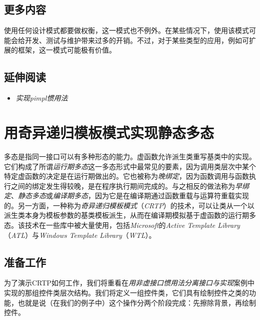 
\subsection{更多内容}



使用任何设计模式都要做权衡，这一模式也不例外。在某些情况下，使用该模式可能会给开发、测试与维护带来过多的开销。不过，对于某些类型的应用，例如可扩展的框架，这一模式可能极有价值。



\subsection{延伸阅读}



\begin{itemize}
\item \textit{实现pimpl惯用法}

\end{itemize}



\section{用奇异递归模板模式实现静态多态}



多态是指同一接口可以有多种形态的能力。虚函数允许派生类重写基类中的实现。它们构成了所谓\textit{运行期多态}这一多态形式中最常见的要素，因为调用类层次中某个特定虚函数的决定是在运行期做出的。它也被称为\textit{晚绑定}，因为函数调用与函数执行之间的绑定发生得较晚，是在程序执行期间完成的。与之相反的做法称为\textit{早绑定}、\textit{静态多态}或\textit{编译期多态}，因为它是在编译期通过函数重载与运算符重载实现的。另一方面，一种称为\textit{奇异递归模板模式}（\textit{CRTP}）的技术，可以让类从一个以派生类本身为模板参数的基类模板派生，从而在编译期模拟基于虚函数的运行期多态。该技术在一些库中被大量使用，包括\textit{Microsoft}的\textit{Active Template Library}（\textit{ATL}）与\textit{Windows Template} \textit{Library}（\textit{WTL}）。



\subsection{准备工作}



为了演示CRTP如何工作，我们将重看在\textit{用非虚接口惯用法分离接口与实现}案例中实现的那组控件类层次结构。我们将定义一组控件类，它们具有绘制控件之类的功能，也就是说（在我们的例子中）这个操作分两个阶段完成：先擦除背景，再绘制控件。


